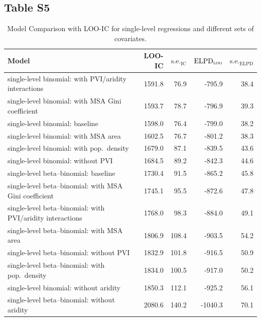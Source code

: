 \documentclass[draft]{agujournal}\usepackage{knitr}
\begin{document}
\subsection*{Table S5}
\begin{table}[H]
\centering
\begingroup\small
\begin{tabular}{p{3in}rrrr}
  \hline
Model & LOO-IC & $\text{s.e.}_{\text{IC}}$ & $\text{ELPD}_{\text{\scshape{loo}}}$ & $\text{s.e.}_{\text{ELPD}}$ \\ 
  \hline
single-level binomial: with PVI/aridity interactions & 1591.8 & 76.9 & -795.9 & 38.4 \\ 
  single-level binomial: with MSA Gini coefficient & 1593.7 & 78.7 & -796.9 & 39.3 \\ 
  single-level binomial: baseline & 1598.0 & 76.4 & -799.0 & 38.2 \\ 
  single-level binomial: with MSA area & 1602.5 & 76.7 & -801.2 & 38.3 \\ 
  single-level binomial: with pop.\ density & 1679.0 & 87.1 & -839.5 & 43.6 \\ 
  single-level binomial: without PVI & 1684.5 & 89.2 & -842.3 & 44.6 \\ 
  single-level beta--binomial: baseline & 1730.4 & 91.5 & -865.2 & 45.8 \\ 
  single-level beta--binomial: with MSA Gini coefficient & 1745.1 & 95.5 & -872.6 & 47.8 \\ 
  single-level beta--binomial: with PVI/aridity interactions & 1768.0 & 98.3 & -884.0 & 49.1 \\ 
  single-level beta--binomial: with MSA area & 1806.9 & 108.4 & -903.5 & 54.2 \\ 
  single-level beta--binomial: without PVI & 1832.9 & 101.8 & -916.5 & 50.9 \\ 
  single-level beta--binomial: with pop.\ density & 1834.0 & 100.5 & -917.0 & 50.2 \\ 
  single-level binomial: without aridity & 1850.3 & 112.1 & -925.2 & 56.1 \\ 
  single-level beta--binomial: without aridity & 2080.6 & 140.2 & -1040.3 & 70.1 \\ 
   \hline
\end{tabular}
\endgroup
\caption[Model comparison: LOO (covariates) for single-level regressions.]{Model Comparison with LOO-IC for single-level regressions and different sets of covariates.} 
\label{tab:loo.vars}
\end{table}
\end{document}
